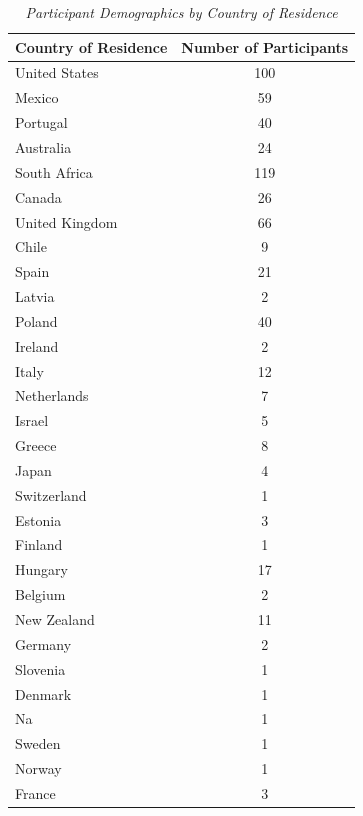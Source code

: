 \documentclass{article}
\begin{document}
\begin{table}[H]
\centering
\begin{tabular}{lc}
\toprule
Country of Residence & Number of Participants \\
\midrule
United States & 100 \\
Mexico & 59 \\
Portugal & 40 \\
Australia & 24 \\
South Africa & 119 \\
Canada & 26 \\
United Kingdom & 66 \\
Chile & 9 \\
Spain & 21 \\
Latvia & 2 \\
Poland & 40 \\
Ireland & 2 \\
Italy & 12 \\
Netherlands & 7 \\
Israel & 5 \\
Greece & 8 \\
Japan & 4 \\
Switzerland & 1 \\
Estonia & 3 \\
Finland & 1 \\
Hungary & 17 \\
Belgium & 2 \\
New Zealand & 11 \\
Germany & 2 \\
Slovenia & 1 \\
Denmark & 1 \\
Na & 1 \\
Sweden & 1 \\
Norway & 1 \\
France & 3 \\
\bottomrule
\end{tabular}
\caption{\textit{Participant Demographics by Country of Residence}}
\end{table}
\end{document}
